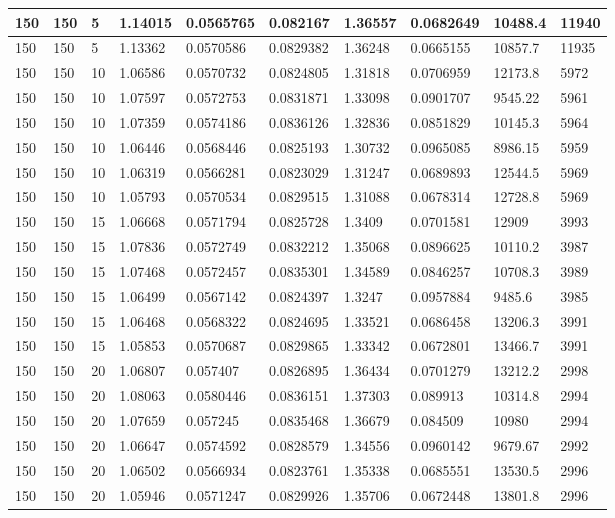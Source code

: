 \begin{landscape}
\begin{longtable}{ | l | l | l | l | l | l | l | l | l | l | }
150 & 150 & 5 & 1.14015 & 0.0565765 & 0.082167 & 1.36557 & 0.0682649 & 10488.4 & 11940\\ \hline
150 & 150 & 5 & 1.13362 & 0.0570586 & 0.0829382 & 1.36248 & 0.0665155 & 10857.7 & 11935\\ \hline
150 & 150 & 10 & 1.06586 & 0.0570732 & 0.0824805 & 1.31818 & 0.0706959 & 12173.8 & 5972\\ \hline
150 & 150 & 10 & 1.07597 & 0.0572753 & 0.0831871 & 1.33098 & 0.0901707 & 9545.22 & 5961\\ \hline
150 & 150 & 10 & 1.07359 & 0.0574186 & 0.0836126 & 1.32836 & 0.0851829 & 10145.3 & 5964\\ \hline
150 & 150 & 10 & 1.06446 & 0.0568446 & 0.0825193 & 1.30732 & 0.0965085 & 8986.15 & 5959\\ \hline
150 & 150 & 10 & 1.06319 & 0.0566281 & 0.0823029 & 1.31247 & 0.0689893 & 12544.5 & 5969\\ \hline
150 & 150 & 10 & 1.05793 & 0.0570534 & 0.0829515 & 1.31088 & 0.0678314 & 12728.8 & 5969\\ \hline
150 & 150 & 15 & 1.06668 & 0.0571794 & 0.0825728 & 1.3409 & 0.0701581 & 12909 & 3993\\ \hline
150 & 150 & 15 & 1.07836 & 0.0572749 & 0.0832212 & 1.35068 & 0.0896625 & 10110.2 & 3987\\ \hline
150 & 150 & 15 & 1.07468 & 0.0572457 & 0.0835301 & 1.34589 & 0.0846257 & 10708.3 & 3989\\ \hline
150 & 150 & 15 & 1.06499 & 0.0567142 & 0.0824397 & 1.3247 & 0.0957884 & 9485.6 & 3985\\ \hline
150 & 150 & 15 & 1.06468 & 0.0568322 & 0.0824695 & 1.33521 & 0.0686458 & 13206.3 & 3991\\ \hline
150 & 150 & 15 & 1.05853 & 0.0570687 & 0.0829865 & 1.33342 & 0.0672801 & 13466.7 & 3991\\ \hline
150 & 150 & 20 & 1.06807 & 0.057407 & 0.0826895 & 1.36434 & 0.0701279 & 13212.2 & 2998\\ \hline
150 & 150 & 20 & 1.08063 & 0.0580446 & 0.0836151 & 1.37303 & 0.089913 & 10314.8 & 2994\\ \hline
150 & 150 & 20 & 1.07659 & 0.057245 & 0.0835468 & 1.36679 & 0.084509 & 10980 & 2994\\ \hline
150 & 150 & 20 & 1.06647 & 0.0574592 & 0.0828579 & 1.34556 & 0.0960142 & 9679.67 & 2992\\ \hline
150 & 150 & 20 & 1.06502 & 0.0566934 & 0.0823761 & 1.35338 & 0.0685551 & 13530.5 & 2996\\ \hline
150 & 150 & 20 & 1.05946 & 0.0571247 & 0.0829926 & 1.35706 & 0.0672448 & 13801.8 & 2996\\ \hline

\end{longtable}
\end{landscape}
